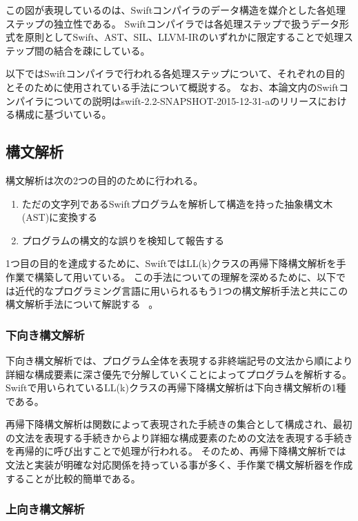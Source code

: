 この図が表現しているのは、Swiftコンパイラのデータ構造を媒介とした各処理ステップの独立性である。
Swiftコンパイラでは各処理ステップで扱うデータ形式を原則としてSwift、AST、SIL、LLVM-IRのいずれかに限定することで処理ステップ間の結合を疎にしている。

以下ではSwiftコンパイラで行われる各処理ステップについて、それぞれの目的とそのために使用されている手法について概説する。
なお、本論文内のSwiftコンパイラについての説明はswift-2.2-SNAPSHOT-2015-12-31-aのリリースにおける構成に基づいている。

\subsection{構文解析}
\label{refinement:structure:parser}

構文解析は次の2つの目的のために行われる。

\begin{enumerate}
    \item ただの文字列であるSwiftプログラムを解析して構造を持った抽象構文木(AST)に変換する
    \item プログラムの構文的な誤りを検知して報告する
\end{enumerate}

1つ目の目的を達成するために、SwiftではLL(k)クラスの再帰下降構文解析を手作業で構築して用いている。
この手法についての理解を深めるために、以下では近代的なプログラミング言語に用いられるもう1つの構文解析手法と共にこの構文解析手法について解説する ~\cite{dragonbook}。

\subsubsection{下向き構文解析}

下向き構文解析では、プログラム全体を表現する非終端記号の文法から順により詳細な構成要素に深さ優先で分解していくことによってプログラムを解析する。
Swiftで用いられているLL(k)クラスの再帰下降構文解析は下向き構文解析の1種である。

再帰下降構文解析は関数によって表現された手続きの集合として構成され、最初の文法を表現する手続きからより詳細な構成要素のための文法を表現する手続きを再帰的に呼び出すことで処理が行われる。
そのため、再帰下降構文解析では文法と実装が明確な対応関係を持っている事が多く、手作業で構文解析器を作成することが比較的簡単である。

\subsubsection{上向き構文解析}

